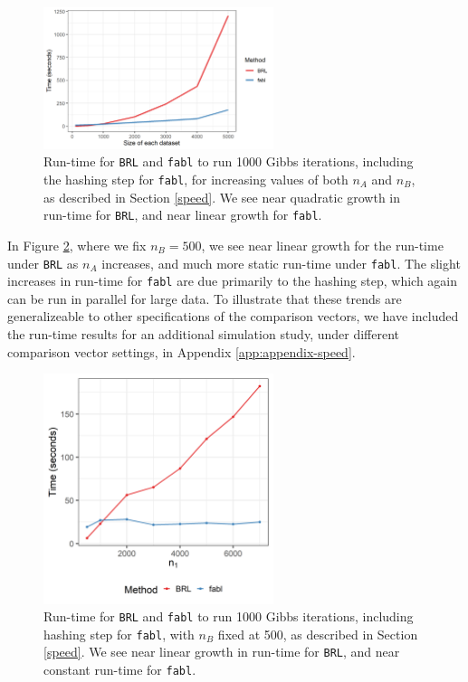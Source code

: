 \documentclass[ba]{imsart}
\begin{document}
	\begin{figure}[t]
		\begin{center} \includegraphics[width=0.6\textwidth]{../notes/figures/sadinle_speed_plot2} 
			\caption{Run-time for \texttt{BRL} and \texttt{fabl} to run 1000 Gibbs iterations, including the hashing step for \texttt{fabl}, for increasing values of both $n_A$ and $n_B$, as described in Section \ref{speed}. We see near quadratic growth in run-time for \texttt{BRL}, and near linear growth for \texttt{fabl}.}\label{fig:speed1}
		\end{center}
	\end{figure}
	
	In Figure \ref{fig:speed2}, where we fix $n_B = 500$, we see near linear growth for the run-time under \texttt{BRL} as $n_A$ increases, and much more static run-time under \texttt{fabl}. The slight increases in run-time for \texttt{fabl} are due primarily to the hashing step, which again can be run in parallel for large data. To illustrate that these trends are generalizeable to other specifications of the comparison vectors, we have included the run-time results for an additional simulation study, under different comparison vector settings, in Appendix \ref{app:appendix-speed}.
	
	\begin{figure}[h!]
		\begin{center} \includegraphics[width=0.6\textwidth]{../notes/figures/speed_plot_fixed_nB_slides} 
			\caption{Run-time for \texttt{BRL} and \texttt{fabl} to run 1000 Gibbs iterations, including hashing step for \texttt{fabl}, with $n_B$ fixed at 500, as described in Section \ref{speed}. We see near linear growth in run-time for \texttt{BRL}, and near constant run-time for \texttt{fabl}.}\label{fig:speed2}
		\end{center}
	\end{figure}
	
\end{document}
